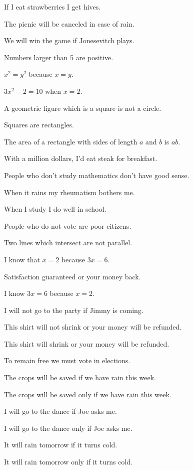 \documentclass[11pt]{book}
\begin{document}
\begin{exercisecols}
\begin{exlist}
\item If I eat strawberries I get hives.
\item The picnic will be canceled in case of rain.
\item We will win the game if Jonesevitch plays.
\item Numbers larger than 5 are positive.
\item $x^2 = y^2$ because $x = y$.
\item $3x^2 - 2 = 10$ when $x = 2$.
\item A geometric figure which is a square is not a circle.
\item Squares are rectangles.
\item The area of a rectangle with sides of length $a$ and $b$ is $ab$.
\item With a million dollars, I'd eat steak for breakfast.
\item People who don't study mathematics don't have good sense.
\item When it rains my rheumatism bothers me.
\item When I study I do well in school.
\item People who do not vote are poor citizens.
\item Two lines which intersect are not parallel.
\item I know that $x = 2$ because $3x = 6$.
\item Satisfaction guaranteed or your money back.
\item I know $3x = 6$ because $x = 2$.
\item I will not go to the party if Jimmy is coming.
\item This shirt will not shrink or your money will be refunded.
\item This shirt will shrink or your money will be refunded.
\item To remain free we must vote in elections.
\item The crops will be saved if we have rain this week.
\item The crops will be saved only if we have rain this week.
\item I will go to the dance if Joe asks me.
\item I will go to the dance only if Joe asks me.
\item It will rain tomorrow if it turns cold.
\item It will rain tomorrow only if it turns cold.
\end{exlist}
\end{exercisecols}
\end{document}
